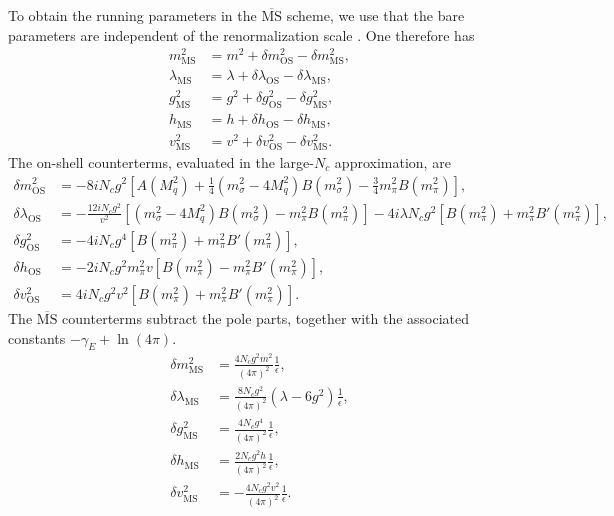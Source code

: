 To obtain the running parameters in the $\overline{\mathrm{MS}}$
scheme, we use that the bare parameters are independent of the
renormalization scale \cite{Folkestad2018,Andersen2024}. One therefore has
\begin{align}
m^2_{\mathrm{MS}} &= m^2 + \delta m^2_{\mathrm{OS}} - \delta m^2_{\mathrm{MS}}, \\
\lambda_{\mathrm{MS}} &= \lambda + \delta\lambda_{\mathrm{OS}} - \delta\lambda_{\mathrm{MS}}, \\
g^2_{\mathrm{MS}} &= g^2 + \delta g^2_{\mathrm{OS}} - \delta g^2_{\mathrm{MS}}, \\
h_{\mathrm{MS}} &= h + \delta h_{\mathrm{OS}} - \delta h_{\mathrm{MS}}, \\
v^2_{\mathrm{MS}} &= v^2 + \delta v^2_{\mathrm{OS}} - \delta v^2_{\mathrm{MS}} .
\end{align}
The on-shell counterterms, evaluated in the large-$N_c$ approximation, are
\begin{align}
\delta m^2_{\mathrm{OS}}
&=
-8iN_cg^2
\left[
A(M_q^2)
+\frac{1}{4}(m_\sigma^2-4M_q^2)B(m_\sigma^2)
-\frac{3}{4}m_\pi^2B(m_\pi^2)
\right], \\
\delta\lambda_{\mathrm{OS}}
&=
-\frac{12iN_cg^2}{v^2}
\left[
(m_\sigma^2-4M_q^2)B(m_\sigma^2)-m_\pi^2B(m_\pi^2)
\right]
-4i\lambda N_c g^2
\left[
B(m_\pi^2)+m_\pi^2B'(m_\pi^2)
\right], \\
\delta g^2_{\mathrm{OS}}
&=
-4iN_cg^4
\left[
B(m_\pi^2)+m_\pi^2B'(m_\pi^2)
\right], \\
\delta h_{\mathrm{OS}}
&=
-2iN_cg^2m_\pi^2v
\left[
B(m_\pi^2)-m_\pi^2B'(m_\pi^2)
\right], \\
\delta v^2_{\mathrm{OS}}
&=
4iN_cg^2v^2
\left[
B(m_\pi^2)+m_\pi^2B'(m_\pi^2)
\right].
\end{align}
The $\overline{\mathrm{MS}}$ counterterms subtract the pole parts,
together with the associated constants \(-\gamma_E + \ln(4\pi)\).
\begin{align}
\delta m^2_{\mathrm{MS}}
&=
\frac{4N_cg^2m^2}{(4\pi)^2}\frac{1}{\epsilon}, \\
\delta\lambda_{\mathrm{MS}}
&=
\frac{8N_cg^2}{(4\pi)^2}\left(\lambda-6g^2\right)\frac{1}{\epsilon}, \\
\delta g^2_{\mathrm{MS}}
&=
\frac{4N_cg^4}{(4\pi)^2}\frac{1}{\epsilon}, \\
\delta h_{\mathrm{MS}}
&=
\frac{2N_cg^2h}{(4\pi)^2}\frac{1}{\epsilon}, \\
\delta v^2_{\mathrm{MS}}
&=
-\frac{4N_cg^2v^2}{(4\pi)^2}\frac{1}{\epsilon}.
\end{align}
